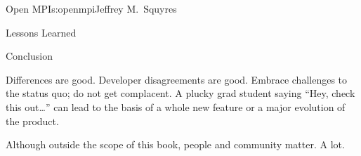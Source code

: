 \begin{aosachapter}{Open MPI}{s:openmpi}{Jeffrey M.\ Squyres}
\begin{aosasect1}{Lessons Learned}
\begin{aosasect2}{Conclusion}
\begin{aosaitemize}
\item Differences are good.  Developer disagreements are good.
  Embrace challenges to the status quo; do not get complacent.  A
  plucky grad student saying ``Hey, check this out{\ldots}'' can lead to
  the basis of a whole new feature or a major evolution of the
  product.

\item Although outside the scope of this book, people and community
  matter.  A lot.
\end{aosaitemize}

\end{aosasect2}

\end{aosasect1}

\end{aosachapter}

